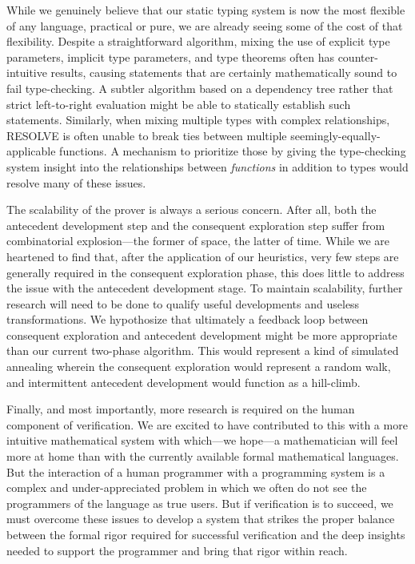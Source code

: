 While we genuinely believe that our static typing system is now the most flexible of any language, practical or pure, we are already seeing some of the cost of that flexibility.  Despite a straightforward algorithm, mixing the use of explicit type parameters, implicit type parameters, and type theorems often has counter-intuitive results, causing statements that are certainly mathematically sound to fail type-checking.  A subtler algorithm based on a dependency tree rather that strict left-to-right evaluation might be able to statically establish such statements.  Similarly, when mixing multiple types with complex relationships, RESOLVE is often unable to break ties between multiple seemingly-equally-applicable functions.  A mechanism to prioritize those by giving the type-checking system insight into the relationships between \emph{functions} in addition to types would resolve many of these issues.

The scalability of the prover is always a serious concern.  After all, both the antecedent development step and the consequent exploration step suffer from combinatorial explosion---the former of space, the latter of time.  While we are heartened to find that, after the application of our heuristics, very few steps are generally required in the consequent exploration phase, this does little to address the issue with the antecedent development stage.  To maintain scalability, further research will need to be done to qualify useful developments and useless transformations.  We hypothosize that ultimately a feedback loop between consequent exploration and antecedent development might be more appropriate than our current two-phase algorithm.  This would represent a kind of simulated annealing wherein the consequent exploration would represent a random walk, and intermittent antecedent development would function as a hill-climb.

Finally, and most importantly, more research is required on the human component of verification.  We are excited to have contributed to this with a more intuitive mathematical system with which---we hope---a mathematician will feel more at home than with the currently available formal mathematical languages.  But the interaction of a human programmer with a programming system is a complex and under-appreciated problem in which we often do not see the programmers of the language as true users.  But if verification is to succeed, we must overcome these issues to develop a system that strikes the proper balance between the formal rigor required for successful verification and the deep insights needed to support the programmer and bring that rigor within reach.
